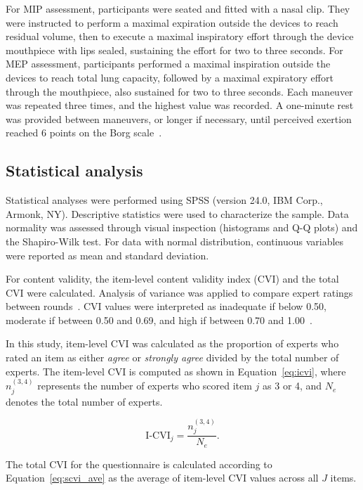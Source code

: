 \documentclass{ieeeaccess}
\begin{document}
For MIP assessment, participants were seated and fitted with a nasal clip. They were instructed to perform a maximal expiration outside the devices to reach residual volume, then to execute a maximal inspiratory effort through the device mouthpiece with lips sealed, sustaining the effort for two to three seconds. For MEP assessment, participants performed a maximal inspiration outside the devices to reach total lung capacity, followed by a maximal expiratory effort through the mouthpiece, also sustained for two to three seconds. Each maneuver was repeated three times, and the highest value was recorded. A one-minute rest was provided between maneuvers, or longer if necessary, until perceived exertion reached 6 points on the Borg scale~\cite{Borg1982}.

\subsection{Statistical analysis}

Statistical analyses were performed using SPSS (version 24.0, IBM Corp., Armonk, NY). Descriptive statistics were used to characterize the sample. Data normality was assessed through visual inspection (histograms and Q-Q plots) and the Shapiro-Wilk test. For data with normal distribution, continuous variables were reported as mean and standard deviation.

For content validity, the item-level content validity index (CVI) and the total CVI were calculated. Analysis of variance was applied to compare expert ratings between rounds~\cite{Yusoff2019}. CVI values were interpreted as inadequate if below 0.50, moderate if between 0.50 and 0.69, and high if between 0.70 and 1.00~\cite{Yusoff2019}.

In this study, item-level CVI was calculated as the proportion of experts who rated an item as either \emph{agree} or \emph{strongly agree} divided by the total number of experts. The item-level CVI is computed as shown in Equation~\ref{eq:icvi}, where \ensuremath{n^{(3,4)}_j} represents the number of experts who scored item \ensuremath{j} as 3 or 4, and \ensuremath{N_e} denotes the total number of experts.

\begin{equation}
  \mathrm{I\mbox{-}CVI}_j = \frac{n_j^{(3,4)}}{N_e}.
  \label{eq:icvi}
\end{equation}

The total CVI for the questionnaire is calculated according to Equation~\eqref{eq:scvi_ave} as the average of item-level CVI values across all \ensuremath{J} items.
\end{document}
